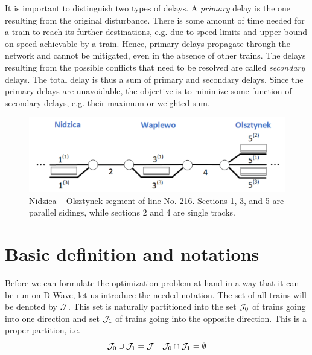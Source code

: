 It is important to distinguish two types of delays. A \emph{primary} delay is the one resulting from
the original disturbance. There is some amount of time needed for a train to reach its further
destinations, e.g. due to speed limits and upper bound on speed achievable by a train. Hence,
primary delays propagate through the network and cannot be mitigated, even in the absence of other
trains. The delays resulting from the possible conflicts that need to be resolved are called
\emph{secondary} delays. The total delay is thus a sum of primary and secondary delays. Since the
primary delays are unavoidable, the objective is to minimize some function of secondary delays, e.g.
their maximum or weighted sum.

\begin{figure}
    \label{fig:railway-network}
    \includegraphics[width=\textwidth]{figures/line_small.pdf}
    \caption{ Nidzica -- Olsztynek segment of line No. 216. Sections 1, 3, and 5 are parallel
        sidings, while sections 2 and 4 are single tracks. }
\end{figure}

\section{Basic definition and notations}
Before we can formulate the optimization problem at hand in a way that it can be run on D-Wave, let
us introduce the needed notation. The set of all trains will be denoted by $\mathcal{J}$. This set is
naturally partitioned into the set $\mathcal{J}_0$ of trains going into one direction and set $\mathcal{J}_1$ of
trains going into the opposite direction. This is a proper partition, i.e.
\begin{equation}
    \mathcal{J}_0 \cup \mathcal{J}_1 = \mathcal{J} \quad \mathcal{J}_0 \cap \mathcal{J}_1 = \emptyset
\end{equation}

